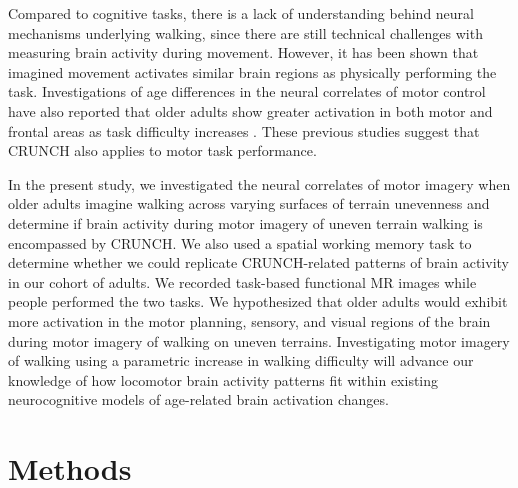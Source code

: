 \documentclass[a4paper,fleqn]{cas-sc}
\begin{document}
Compared to cognitive tasks, there is a lack of understanding behind neural mechanisms underlying walking, since there are still technical challenges with measuring brain activity during movement. However, it has been shown that imagined movement activates similar brain regions as physically performing the task. Investigations of age differences in the neural correlates of motor control have also reported that older adults show greater activation in both motor and frontal areas as task difficulty increases \citep{Gerver2020, vanRuitenbeek2023}. These previous studies suggest that CRUNCH also applies to motor task performance. 

In the present study, we investigated the neural correlates of motor imagery when older adults imagine walking across varying surfaces of terrain unevenness and determine if brain activity during motor imagery of uneven terrain walking is encompassed by CRUNCH. We also used a spatial working memory task to determine whether we could replicate CRUNCH-related patterns of brain activity in our cohort of adults. We recorded task-based functional MR images while people performed the two tasks. We hypothesized that older adults would exhibit more activation in the motor planning, sensory, and visual regions \citep{Allali2014, Gerver2020} of the brain during motor imagery of walking on uneven terrains. Investigating motor imagery of walking using a parametric increase in walking difficulty will advance our knowledge of how locomotor brain activity patterns fit within existing neurocognitive models of age-related brain activation changes.


\section{Methods}
\end{document}
